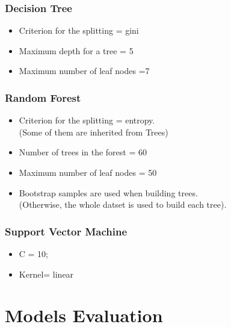 \documentclass[12pt]{article}
\begin{document}
\subsubsection{Decision Tree}

\begin{itemize}
\item Criterion for the splitting = gini
\item Maximum depth for a tree = 5
\item Maximum number of leaf nodes =7
\end{itemize}


\subsubsection{Random Forest}

\begin{itemize}
\item Criterion for the splitting = entropy. \\ (Some of them are inherited from Trees)
\item Number of trees in the forest = 60
\item Maximum number of leaf nodes = 50
\item Bootstrap samples are used when building trees. \\ (Otherwise, the whole datset is used to build each tree).
\end{itemize}

\subsubsection{Support Vector Machine}

\begin{itemize}
\item C = 10;
\item Kernel= linear
\end{itemize}
                            
\newpage
\section{Models Evaluation}
\end{document}
